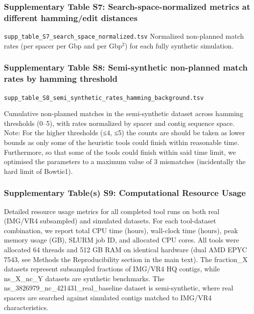 \documentclass[
]{article}
\begin{document}
\subsubsection{Supplementary Table S7: Search-space-normalized metrics
at different hamming/edit
distances}\label{tbl-supp-normalized-threshold3}

\texttt{supp\_table\_S7\_search\_space\_normalized.tsv} Normalized
non-planned match rates (per spacer per Gbp and per Gbp\(^2\)) for each
fully synthetic simulation.

\subsubsection{Supplementary Table S8: Semi-synthetic non-planned match
rates by hamming threshold}\label{tbl-supp-semisynthetic}

\texttt{supp\_table\_S8\_semi\_synthetic\_rates\_hamming\_background.tsv}

Cumulative non-planned matches in the semi-synthetic dataset across
hamming thresholds (0--5), with rates normalized by spacer and contig
sequence space. Note: For the higher thresholds (≤4, ≤5) the counts are
should be taken as lower bounds as only some of the heuristic tools
could finish within reasonable time. Furthermore, so that some of the
tools could finish within said time limit, we optimised the parameters
to a maximum value of 3 mismatches (incidentally the hard limit of
Bowtie1).

\subsubsection{Supplementary Table(s) S9: Computational Resource
Usage}\label{tbl-supp-resource-usage}

Detailed resource usage metrics for all completed tool runs on both real
(IMG/VR4 subsampled) and simulated datasets. For each tool-dataset
combination, we report total CPU time (hours), wall-clock time (hours),
peak memory usage (GB), SLURM job ID, and allocated CPU cores. All tools
were allocated 64 threads and 512 GB RAM on identical hardware (dual AMD
EPYC 7543, see Methods the Reproducibility section in the main text).
The fraction\_X datasets represent subsampled fractions of IMG/VR4 HQ
contigs, while ns\_X\_nc\_Y datasets are synthetic benchmarks. The
ns\_3826979\_nc\_421431\_real\_baseline dataset is semi-synthetic, where
real spacers are searched against simulated contigs matched to IMG/VR4
characteristics.
\end{document}

